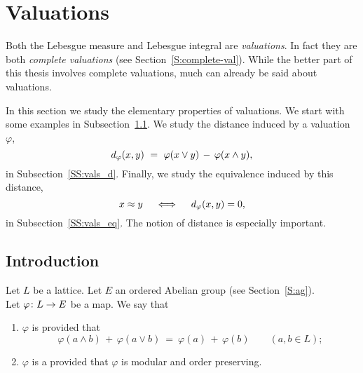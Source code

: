 \documentclass[main.tex]{subfiles}
\begin{document}
\section{Valuations}
\label{S:vals}
\noindent
Both the Lebesgue measure and Lebesgue integral
are \emph{valuations}.
In fact they are both \emph{complete valuations}
(see Section~\ref{S:complete-val}).
While the better part of this thesis involves
complete valuations,
much can already be said about valuations.

In this section we study the elementary properties of valuations.
We start with some examples in Subsection~\ref{SS:vals_intro}.
We study the distance 
induced by a valuation~$\varphi$,
\begin{equation*}
d_{\smash{\varphi}}(x,y) \ =\ \varphi(x\vee y) \,-\, \varphi(x\wedge y),
\end{equation*}
in Subsection~\ref{SS:vals_d}.
Finally, 
we study the equivalence induced by this distance,
\begin{equation*}
x\approx y\quad\iff\quad d_{\smash{\varphi}}(x,y)=0,
\end{equation*}
in Subsection~\ref{SS:vals_eq}.
The notion of distance 
is especially important.
\subsection{Introduction}
\label{SS:vals_intro}
\noindent
%
%
\begin{dfn}

\label{D:val}
Let $L$ be a lattice. 
Let $E$ an ordered Abelian group
(see Section~\ref{S:ag}).\\
Let  $\varphi\colon L \rightarrow E$ be a map.
We say that
\begin{enumerate}
\item
\label{D:val-mod}
$\varphi$ is  provided that
\begin{equation*}
\varphi(a\wedge b) \,+\, \varphi(a \vee b)
\ =\ 
\varphi(a) \,+\, \varphi(b)
\qquad(a,b\in L);
\end{equation*}

\item
\label{D:val-val}
$\varphi$ is a 
provided that $\varphi$ is modular and order preserving.
\end{enumerate}
\end{dfn}
\end{document}
